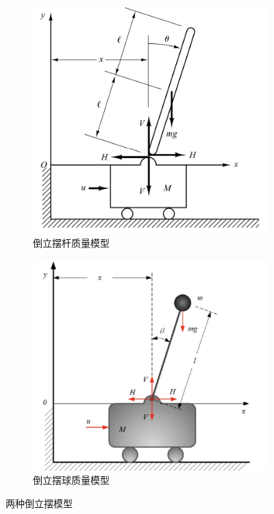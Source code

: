 \documentclass{article}
\begin{document}
\begin{figure}[htbp]
    \centering
    \begin{subfigure}[b]{0.45\textwidth}
        \centering
        \includegraphics[width=\textwidth]{imgs/figure1.png}
        \caption{倒立摆杆质量模型}
        \label{fig:杆质量模型}
    \end{subfigure}
    \hfill
    \begin{subfigure}[b]{0.45\textwidth}
        \centering
        \includegraphics[width=\textwidth]{imgs/figure2.png}
        \caption{倒立摆球质量模型}
        \label{fig:球质量模型}
    \end{subfigure}
    \caption{两种倒立摆模型}
    \label{fig:两种倒立摆模型}
\end{figure}
\end{document}
